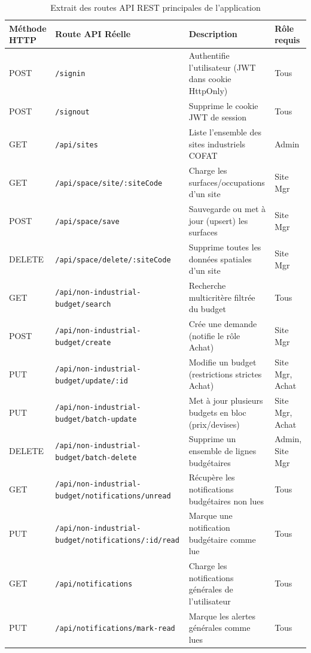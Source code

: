 \begin{table}[h]
\centering
\begin{tabular}{|p{2.5cm}|p{6.2cm}|p{4.3cm}|p{2cm}|}
\hline
\textbf{Méthode HTTP} & \textbf{Route API Réelle} & \textbf{Description} & \textbf{Rôle requis} \\ \hline
POST & \texttt{/signin} & Authentifie l'utilisateur (JWT dans cookie HttpOnly) & Tous \\ \hline
POST & \texttt{/signout} & Supprime le cookie JWT de session & Tous \\ \hline
GET & \texttt{/api/sites} & Liste l'ensemble des sites industriels COFAT & Admin \\ \hline
GET & \texttt{/api/space/site/:siteCode} & Charge les surfaces/occupations d'un site & Site Mgr \\ \hline
POST & \texttt{/api/space/save} & Sauvegarde ou met à jour (upsert) les surfaces & Site Mgr \\ \hline
DELETE & \texttt{/api/space/delete/:siteCode} & Supprime toutes les données spatiales d'un site & Site Mgr \\ \hline
GET & \texttt{/api/non-industrial-budget/search} & Recherche multicritère filtrée du budget & Tous \\ \hline
POST & \texttt{/api/non-industrial-budget/create} & Crée une demande (notifie le rôle Achat) & Site Mgr \\ \hline
PUT & \texttt{/api/non-industrial-budget/update/:id} & Modifie un budget (restrictions strictes Achat) & Site Mgr, Achat \\ \hline
PUT & \texttt{/api/non-industrial-budget/batch-update} & Met à jour plusieurs budgets en bloc (prix/devises) & Site Mgr, Achat \\ \hline
DELETE & \texttt{/api/non-industrial-budget/batch-delete} & Supprime un ensemble de lignes budgétaires & Admin, Site Mgr \\ \hline
GET & \texttt{/api/non-industrial-budget/notifications/unread} & Récupère les notifications budgétaires non lues & Tous \\ \hline
PUT & \texttt{/api/non-industrial-budget/notifications/:id/read} & Marque une notification budgétaire comme lue & Tous \\ \hline
GET & \texttt{/api/notifications} & Charge les notifications générales de l'utilisateur & Tous \\ \hline
PUT & \texttt{/api/notifications/mark-read} & Marque les alertes générales comme lues & Tous \\ \hline
\end{tabular}
\caption{Extrait des routes API REST principales de l'application}
\label{tab:api_endpoints}
\end{table}


